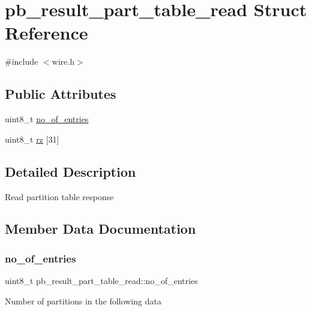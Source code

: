 \hypertarget{structpb__result__part__table__read}{}\section{pb\+\_\+result\+\_\+part\+\_\+table\+\_\+read Struct Reference}
\label{structpb__result__part__table__read}


{\ttfamily \#include $<$wire.\+h$>$}

\subsection*{Public Attributes}
\begin{DoxyCompactItemize}
\item 
uint8\+\_\+t \hyperlink{structpb__result__part__table__read_af50385764b2d502f364aec8269afe942}{no\+\_\+of\+\_\+entries}
\item 
uint8\+\_\+t \hyperlink{structpb__result__part__table__read_a26d2d375f1f46f3f91476cf0740b33e4}{rz} \mbox{[}31\mbox{]}
\end{DoxyCompactItemize}


\subsection{Detailed Description}
Read partition table response 

\subsection{Member Data Documentation}
\mbox{\label{structpb__result__part__table__read_af50385764b2d502f364aec8269afe942}} 
\subsubsection{\texorpdfstring{no\+\_\+of\+\_\+entries}{no\_of\_entries}}
{\footnotesize\ttfamily uint8\+\_\+t pb\+\_\+result\+\_\+part\+\_\+table\+\_\+read\+::no\+\_\+of\+\_\+entries}

Number of partitions in the following data \mbox{\label{structpb__result__part__table__read_a26d2d375f1f46f3f91476cf0740b33e4}} 

